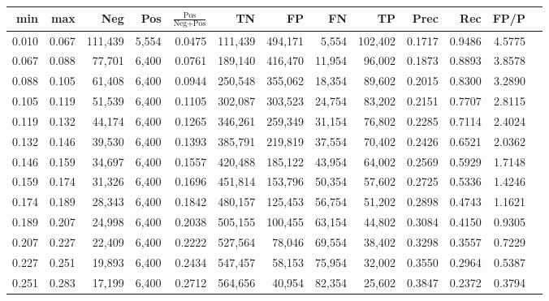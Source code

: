\begin{tabular}{rrrrrrrrrrrrr}
\toprule
  min &   max &     Neg &   Pos & $\frac{\text{Pos}}{\text{Neg}+\text{Pos}}$ &      TN &      FP &      FN &      TP &   Prec &    Rec &   FP/P \\
\midrule
0.010 & 0.067 & 111,439 & 5,554 &                                     0.0475 & 111,439 & 494,171 &   5,554 & 102,402 & 0.1717 & 0.9486 & 4.5775 \\
0.067 & 0.088 &  77,701 & 6,400 &                                     0.0761 & 189,140 & 416,470 &  11,954 &  96,002 & 0.1873 & 0.8893 & 3.8578 \\
0.088 & 0.105 &  61,408 & 6,400 &                                     0.0944 & 250,548 & 355,062 &  18,354 &  89,602 & 0.2015 & 0.8300 & 3.2890 \\
0.105 & 0.119 &  51,539 & 6,400 &                                     0.1105 & 302,087 & 303,523 &  24,754 &  83,202 & 0.2151 & 0.7707 & 2.8115 \\
0.119 & 0.132 &  44,174 & 6,400 &                                     0.1265 & 346,261 & 259,349 &  31,154 &  76,802 & 0.2285 & 0.7114 & 2.4024 \\
0.132 & 0.146 &  39,530 & 6,400 &                                     0.1393 & 385,791 & 219,819 &  37,554 &  70,402 & 0.2426 & 0.6521 & 2.0362 \\
0.146 & 0.159 &  34,697 & 6,400 &                                     0.1557 & 420,488 & 185,122 &  43,954 &  64,002 & 0.2569 & 0.5929 & 1.7148 \\
0.159 & 0.174 &  31,326 & 6,400 &                                     0.1696 & 451,814 & 153,796 &  50,354 &  57,602 & 0.2725 & 0.5336 & 1.4246 \\
0.174 & 0.189 &  28,343 & 6,400 &                                     0.1842 & 480,157 & 125,453 &  56,754 &  51,202 & 0.2898 & 0.4743 & 1.1621 \\
0.189 & 0.207 &  24,998 & 6,400 &                                     0.2038 & 505,155 & 100,455 &  63,154 &  44,802 & 0.3084 & 0.4150 & 0.9305 \\
0.207 & 0.227 &  22,409 & 6,400 &                                     0.2222 & 527,564 &  78,046 &  69,554 &  38,402 & 0.3298 & 0.3557 & 0.7229 \\
0.227 & 0.251 &  19,893 & 6,400 &                                     0.2434 & 547,457 &  58,153 &  75,954 &  32,002 & 0.3550 & 0.2964 & 0.5387 \\
0.251 & 0.283 &  17,199 & 6,400 &                                     0.2712 & 564,656 &  40,954 &  82,354 &  25,602 & 0.3847 & 0.2372 & 0.3794 \\

\end{tabular}
